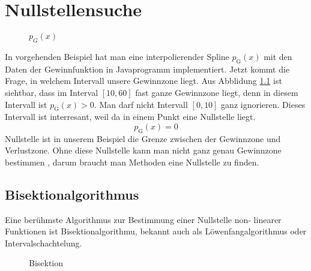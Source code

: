 \chapter{Nullstellensuche}
\begin{figure}[ht]
\centering
\def\svgwidth{1.00\textwidth}

\caption{$p_G(x)$}
\label{fig:a}

\end{figure}
In vorgehenden Beispiel hat man eine interpolierender Spline  $p_\textrm{G}(x)$ mit den Daten der Gewinnfunktion in Javaprogramm implementiert.
Jetzt kommt die Frage, in welchem Intervall unsere Gewinnzone liegt. Aus Abblidung \ref{fig:a} ist siehtbar, dass im Interval $[10,60]$ fast ganze Gewinnzone liegt, denn in diesem Intervall ist  $p_\textrm{G}(x) > 0$.
Man darf nicht  Intervall $[0,10]$ ganz ignorieren. Dieses Intervall ist interresant, weil da in einem Punkt eine Nullstelle liegt.
\begin{equation}
p_\textrm{G}(x) =0
\end{equation}
Nullstelle ist in unserem Beispiel die Grenze zwischen der Gewinnzone und Verlustzone. Ohne diese Nullstelle kann man nicht ganz genau Gewinnzone bestimmen , darum braucht man Methoden eine Nullstelle zu finden.

\section{Bisektionalgorithmus}
Eine berühmste Algorithmus zur Bestimmung  einer Nullstelle non- linearer Funktionen ist Bisektionalgorithmu, bekannt auch als Löwenfangalgorithmus oder Intervalschachtelung.
\begin{figure}[ht]
\centering
\def\svgwidth{1.00\textwidth}

\caption{Bisektion}
\label{fig:bar}
\end{figure}

